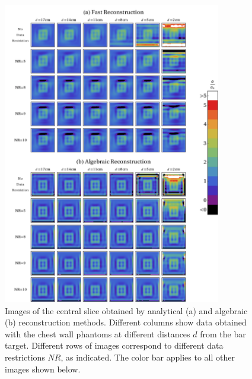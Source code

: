 \begin{figure}[htbp]
\begin{center}
\begin{minipage}[h]{1\textwidth}
\begin{center}
\includegraphics[width=0.85\textwidth]{./figures/chestwall_4.pdf}
\end{center}
\end{minipage}
\end{center}
\caption{\label{fig:central}
  Images of the central slice obtained by analytical (a) and algebraic
  (b) reconstruction methods. Different columns show data obtained
  with the chest wall phantoms at different distances $d$ from the bar
  target.  Different rows of images correspond to different data
  restrictions $NR$, as indicated.  The color bar applies to all other
  images shown below.}
\end{figure}

